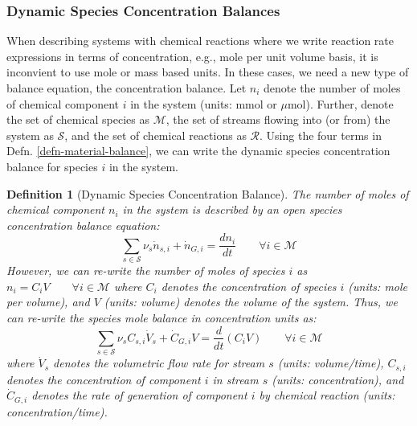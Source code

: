 \documentclass{article}[11pt]
\newtheorem{defn}{Definition}
\begin{document}
\subsubsection*{Dynamic Species Concentration Balances}
When describing systems with chemical reactions where we write reaction rate expressions in terms of 
concentration, e.g., mole per unit volume basis, it is inconvient to use mole or mass based units.
In these cases, we need a new type of balance equation, the concentration balance. 
Let $n_{i}$ denote the number of moles of chemical component $i$ in the system (units: mmol or  $\mu$mol). 
Further, denote the set of chemical species as $\mathcal{M}$, 
the set of streams flowing into (or from) the system as $\mathcal{S}$, and the set of chemical reactions as $\mathcal{R}$.
Using the four terms in Defn. \ref{defn-material-balance}, we can write the dynamic species concentration balance for species $i$ in the system.

\begin{mdframed}
\begin{defn}[Dynamic Species Concentration Balance]\label{defn-dynamic-species-concentration-balance}
The number of moles of chemical component $n_{i}$ in the system is described by an open species concentration balance equation:
\begin{equation}
\sum_{s\in\mathcal{S}}\nu_{s}\dot{n}_{s,i} + \dot{n}_{G,i} = \frac{dn_{i}}{dt}
\qquad\forall{i}\in\mathcal{M}
\end{equation}
However, we can re-write the number of moles of species $i$ as $n_{i} = C_{i}V\qquad\forall{i}\in\mathcal{M}$
where $C_{i}$ denotes the concentration of species $i$ (units: mole per volume), and $V$ (units: volume) denotes the volume of the system. 
Thus, we can re-write the species mole balance in concentration units as:
\begin{equation}\label{eqn:concentration-balance}
\sum_{s\in\mathcal{S}}\nu_{s}C_{s,i}\dot{V}_{s} + \dot{C}_{G,i}V = \frac{d}{dt}\left(C_{i}V\right)\qquad\forall{i}\in\mathcal{M}
\end{equation}
where $\dot{V}_{s}$ denotes the volumetric flow rate for stream $s$ (units: volume/time), 
$C_{s,i}$ denotes the concentration of component $i$ in stream $s$ (units: concentration), 
and $\dot{C}_{G,i}$ denotes the rate of generation of component $i$ by chemical reaction (units: concentration/time).
\end{defn}
\end{mdframed}
\end{document}
